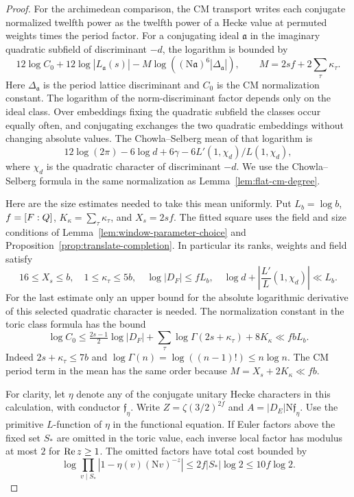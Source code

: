 \begin{proof}
For the archimedean comparison, the CM transport writes
each conjugate normalized twelfth power as the twelfth
power of a Hecke value at permuted weights times the
period factor. For a conjugating ideal \(\mathfrak a\) in
the imaginary quadratic subfield of discriminant \(-d\),
the logarithm is bounded by
\[
 12\log C_0+12\log |L_{\mathfrak a}(s)|
       -M\log((\mathrm N\mathfrak a)^6|\Delta_{\mathfrak a}|),
 \qquad M=2sf+2\sum_\tau\kappa_\tau .
\]
Here \(\Delta_{\mathfrak a}\) is the period lattice
discriminant and \(C_0\) is the CM normalization constant.
The logarithm of the norm-discriminant factor depends only
on the ideal class. Over embeddings fixing the quadratic
subfield the classes occur equally often, and conjugating
exchanges the two quadratic embeddings without changing
absolute values. The Chowla--Selberg mean of that
logarithm is
\[
 12\log(2\pi)-6\log d+6\gamma-6L'(1,\chi_d)/L(1,\chi_d),
\]
where \(\chi_d\) is the quadratic character of discriminant
\(-d\). We use the Chowla--Selberg formula in the same normalization
as Lemma~\ref{lem:flat-cm-degree}. \cite{colmez-chowla-selberg}

Here are the size estimates needed to take this mean uniformly. Put
\(L_b=\log b\), \(f=[F:Q]\), \(K_\kappa=\sum_\tau\kappa_\tau\),
and \(X_s=2sf\). The fitted square uses the field and size conditions
of Lemma~\ref{lem:window-parameter-choice} and
Proposition~\ref{prop:translate-completion}. In particular its ranks,
weights and field satisfy
\[
 16\le X_s\le b,\quad 1\le\kappa_\tau\le5b,\quad
 \log |D_F|\le fL_b,\quad
 \log d+\left|\frac{L'}{L}(1,\chi_d)\right|\ll L_b .
\]
For the last estimate only an upper bound for the absolute logarithmic
derivative of this selected quadratic character is needed. The
normalization constant in the toric class formula has the bound
\[
 \log C_0\le\tfrac{2s-1}{2}\log|D_F|
      +\sum_\tau\log\Gamma(2s+\kappa_\tau)+8K_\kappa
      \ll fbL_b.
\]
Indeed \(2s+\kappa_\tau\le7b\) and
\(\log\Gamma(n)=\log((n-1)!)\le n\log n\).
The CM period term in the mean has the same order because
\(M=X_s+2K_\kappa\ll fb\).

For clarity, let \(\eta\) denote any of the conjugate unitary Hecke
characters in this calculation, with conductor \(\mathfrak f_\eta\).
Write \(Z=\zeta(3/2)^{2f}\) and
\(A=|D_E|\mathrm N\mathfrak f_\eta\).
Use the primitive \(L\)-function of \(\eta\) in the functional equation.
If Euler factors above the fixed set \(S_*\) are omitted in the toric
value, each inverse local factor has modulus at most \(2\) for
\(\operatorname{Re} z\ge1\). The omitted factors have total cost bounded by
\[
 \log\prod_{v\mid S_*}|1-\eta(v)(\mathrm Nv)^{-z}|
      \le 2f |S_*|\log2\le10f\log2 .
\]


\end{proof}
